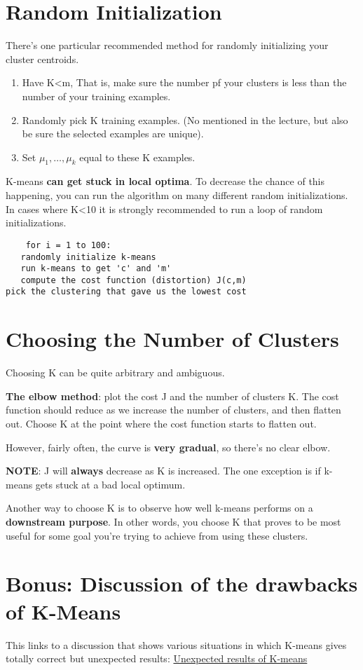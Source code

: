 \section{Random Initialization}
There's one particular recommended method for randomly initializing your cluster centroids.
\begin{enumerate}
	\item Have K<m, That is, make sure the number pf your clusters is less than the number of your training examples.
	\item Randomly pick K training examples. (No mentioned in the lecture, but also be sure the selected examples are unique).
	\item Set $\mu_1, \dots, \mu_k$ equal to these K examples.
\end{enumerate}

K-means {\bf can get stuck in local optima}. To decrease the chance of this happening, you can run the algorithm on many different random initializations. In cases where K<10 it is strongly recommended to run a loop of random initializations.
\begin{verbatim}
	for i = 1 to 100:
   randomly initialize k-means
   run k-means to get 'c' and 'm'
   compute the cost function (distortion) J(c,m)
pick the clustering that gave us the lowest cost
\end{verbatim}

\section{Choosing the Number of Clusters}
Choosing K can be quite arbitrary and ambiguous.

\textbf{The elbow method}: plot the cost J and the number of clusters K. The cost function should reduce as we increase the number of clusters, and then flatten out. Choose K at the point where the cost function starts to flatten out.

However, fairly often, the curve is \textbf{very gradual}, so there's no clear elbow.

\textbf{NOTE}: J will \textbf{always} decrease as K is increased. The one exception is if k-means gets stuck at a bad local optimum.

Another way to choose K is to observe how well k-means performs on a \textbf{downstream purpose}. In other words, you choose K that proves to be most useful for some goal you're trying to achieve from using these clusters.

\section{Bonus: Discussion of the drawbacks of K-Means}
This links to a discussion that shows various situations in which K-means gives totally correct but unexpected results:
\href{http://stats.stackexchange.com/questions/133656/how-to-understand-the-drawbacks-of-k-means}{Unexpected results of K-means}
